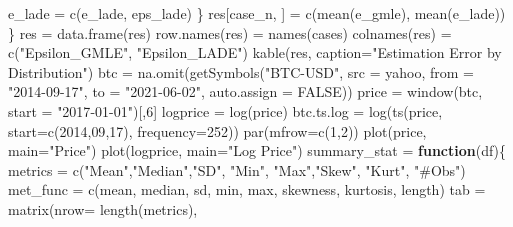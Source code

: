 \documentclass[
  11pt,
]{article}
\newenvironment{Shaded}{\begin{snugshade}}{\end{snugshade}}
\newcommand{\AttributeTok}[1]{\textcolor[rgb]{0.77,0.63,0.00}{#1}}
\newcommand{\ConstantTok}[1]{\textcolor[rgb]{0.00,0.00,0.00}{#1}}
\newcommand{\ControlFlowTok}[1]{\textcolor[rgb]{0.13,0.29,0.53}{\textbf{#1}}}
\newcommand{\DecValTok}[1]{\textcolor[rgb]{0.00,0.00,0.81}{#1}}
\newcommand{\FunctionTok}[1]{\textcolor[rgb]{0.00,0.00,0.00}{#1}}
\newcommand{\NormalTok}[1]{#1}
\newcommand{\OtherTok}[1]{\textcolor[rgb]{0.56,0.35,0.01}{#1}}
\newcommand{\StringTok}[1]{\textcolor[rgb]{0.31,0.60,0.02}{#1}}
\begin{document}
\begin{Shaded}
\begin{Highlighting}[]
\NormalTok{    e\_lade }\OtherTok{=} \FunctionTok{c}\NormalTok{(e\_lade, eps\_lade)}
\NormalTok{  \}}
\NormalTok{  res[case\_n, ] }\OtherTok{=} \FunctionTok{c}\NormalTok{(}\FunctionTok{mean}\NormalTok{(e\_gmle), }\FunctionTok{mean}\NormalTok{(e\_lade))}
\NormalTok{\}}
\NormalTok{res }\OtherTok{=} \FunctionTok{data.frame}\NormalTok{(res)}
\FunctionTok{row.names}\NormalTok{(res) }\OtherTok{=} \FunctionTok{names}\NormalTok{(cases)}
\FunctionTok{colnames}\NormalTok{(res) }\OtherTok{=} \FunctionTok{c}\NormalTok{(}\StringTok{"Epsilon\_GMLE"}\NormalTok{, }\StringTok{"Epsilon\_LADE"}\NormalTok{)}
\FunctionTok{kable}\NormalTok{(res, }\AttributeTok{caption=}\StringTok{"Estimation Error by Distribution"}\NormalTok{)}
\NormalTok{btc }\OtherTok{=} \FunctionTok{na.omit}\NormalTok{(}\FunctionTok{getSymbols}\NormalTok{(}\StringTok{"BTC{-}USD"}\NormalTok{, }\AttributeTok{src =} \StringTok{\textquotesingle{}yahoo\textquotesingle{}}\NormalTok{, }\AttributeTok{from =} \StringTok{"2014{-}09{-}17"}\NormalTok{, }\AttributeTok{to =} \StringTok{"2021{-}06{-}02"}\NormalTok{, }\AttributeTok{auto.assign =} \ConstantTok{FALSE}\NormalTok{))}
\NormalTok{price }\OtherTok{=} \FunctionTok{window}\NormalTok{(btc, }\AttributeTok{start =} \StringTok{"2017{-}01{-}01"}\NormalTok{)[,}\DecValTok{6}\NormalTok{]}
\NormalTok{logprice }\OtherTok{=} \FunctionTok{log}\NormalTok{(price)}
\NormalTok{btc.ts.log }\OtherTok{=} \FunctionTok{log}\NormalTok{(}\FunctionTok{ts}\NormalTok{(price, }\AttributeTok{start=}\FunctionTok{c}\NormalTok{(}\DecValTok{2014}\NormalTok{,}\DecValTok{09}\NormalTok{,}\DecValTok{17}\NormalTok{), }\AttributeTok{frequency=}\DecValTok{252}\NormalTok{))}
\FunctionTok{par}\NormalTok{(}\AttributeTok{mfrow=}\FunctionTok{c}\NormalTok{(}\DecValTok{1}\NormalTok{,}\DecValTok{2}\NormalTok{))}
\FunctionTok{plot}\NormalTok{(price, }\AttributeTok{main=}\StringTok{"Price"}\NormalTok{) }
\FunctionTok{plot}\NormalTok{(logprice, }\AttributeTok{main=}\StringTok{"Log Price"}\NormalTok{)}
\NormalTok{summary\_stat }\OtherTok{=} \ControlFlowTok{function}\NormalTok{(df)\{}
\NormalTok{  metrics }\OtherTok{=} \FunctionTok{c}\NormalTok{(}\StringTok{"Mean"}\NormalTok{,}\StringTok{"Median"}\NormalTok{,}\StringTok{"SD"}\NormalTok{, }\StringTok{"Min"}\NormalTok{, }\StringTok{"Max"}\NormalTok{,}\StringTok{"Skew"}\NormalTok{, }\StringTok{"Kurt"}\NormalTok{, }\StringTok{"\#Obs"}\NormalTok{)}
\NormalTok{  met\_func }\OtherTok{=} \FunctionTok{c}\NormalTok{(mean, median, sd, min, max, skewness, kurtosis, length)}
\NormalTok{  tab }\OtherTok{=} \FunctionTok{matrix}\NormalTok{(}\AttributeTok{nrow=} \FunctionTok{length}\NormalTok{(metrics), }

\end{Highlighting}
\end{Shaded}
\end{document}
